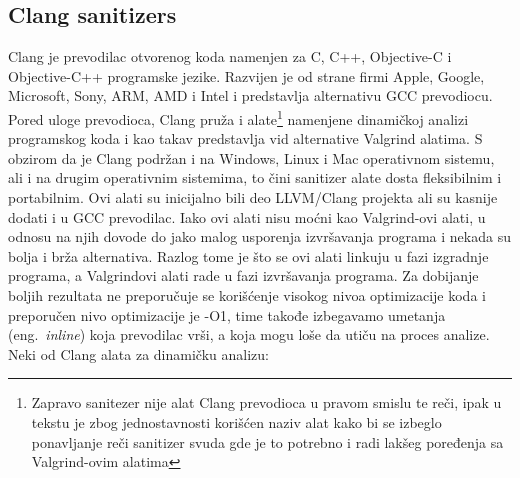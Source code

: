 \documentclass[a4paper]{article}
\begin{document}
\subsection{Clang sanitizers}
Clang je prevodilac otvorenog koda namenjen za C, C++, Objective-C i Objective-C++ programske jezike. Razvijen je od strane firmi Apple, Google, Microsoft, Sony, ARM, AMD i Intel i predstavlja alternativu GCC prevodiocu. Pored uloge prevodioca, Clang pruža i alate\footnote{Zapravo sanitezer nije alat Clang prevodioca u pravom smislu te reči, ipak u tekstu je zbog jednostavnosti korišćen naziv alat kako bi se izbeglo ponavljanje reči sanitizer svuda gde je to potrebno i radi lakšeg poređenja sa Valgrind-ovim alatima} namenjene dinamičkoj analizi programskog koda i kao takav predstavlja vid alternative Valgrind alatima. S obzirom da je Clang podržan i na Windows, Linux i Mac operativnom sistemu, ali i na drugim operativnim sistemima, to čini sanitizer alate dosta fleksibilnim i portabilnim. Ovi alati su inicijalno bili deo LLVM/Clang projekta ali su kasnije dodati i u GCC prevodilac. Iako ovi alati nisu moćni kao Valgrind-ovi alati, u odnosu na njih dovode do jako malog usporenja izvršavanja programa i nekada su bolja i brža alternativa. Razlog tome je što se ovi alati linkuju u fazi izgradnje programa, a Valgrindovi alati rade u fazi izvršavanja programa. Za dobijanje boljih rezultata ne preporučuje se korišćenje visokog nivoa optimizacije koda i preporučen nivo optimizacije je -O1, time takođe izbegavamo umetanja (eng.~{\em inline}) koja prevodilac vrši, a koja mogu loše da utiču na proces analize. Neki od Clang alata za dinamičku analizu:
\end{document}
